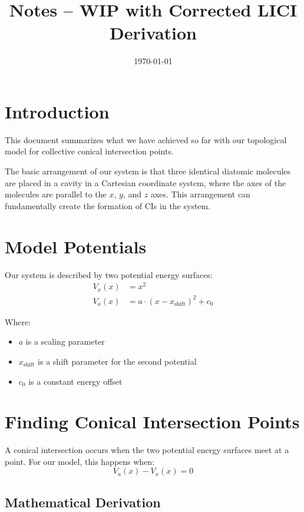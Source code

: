 \documentclass{article}
\title{Notes -- WIP with Corrected LICI Derivation}
\date{\today}
\begin{document}
\maketitle

\section{Introduction}

This document summarizes what we have achieved so far with our topological model for collective conical intersection points.

The basic arrangement of our system is that three identical diatomic molecules are placed in a cavity in a Cartesian coordinate system, where the axes of the molecules are parallel to the $x$, $y$, and $z$ axes. This arrangement can fundamentally create the formation of CIs in the system.

\section{Model Potentials}

Our system is described by two potential energy surfaces:
\begin{align}
V_x(x) &= x^2 \\
V_a(x) &= a \cdot (x - x_{\text{shift}})^2 + c_0
\end{align}

Where:
\begin{itemize}
    \item $a$ is a scaling parameter
    \item $x_{\text{shift}}$ is a shift parameter for the second potential
    \item $c_0$ is a constant energy offset
\end{itemize}

\section{Finding Conical Intersection Points}

A conical intersection occurs when the two potential energy surfaces meet at a point. For our model, this happens when:
\begin{equation}
V_a(x) - V_x(x) = 0
\end{equation}

\subsection{Mathematical Derivation}
\end{document}
